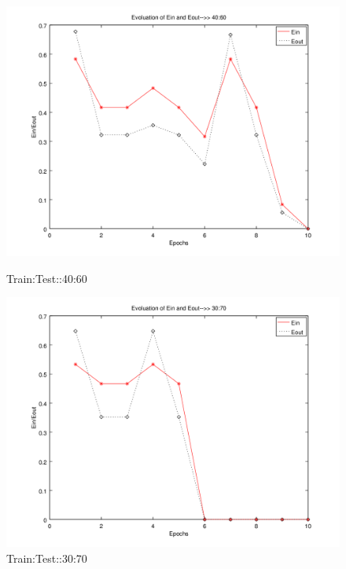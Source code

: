 \documentclass{sem6}
\begin{document}
\begin{figure}[!tbp]
\centering
\begin{minipage}[b]{0.45\textwidth}
\includegraphics[width=\textwidth]{../perceptron/perceptron4.png}
\caption{Train:Test::40:60}
\end{minipage}
\hfill
\begin{minipage}[b]{0.45\textwidth}
\includegraphics[width=\textwidth]{../perceptron/perceptron5.png}
\caption{Train:Test::30:70}
\end{minipage}
\end{figure}


\newpage
\end{document}
